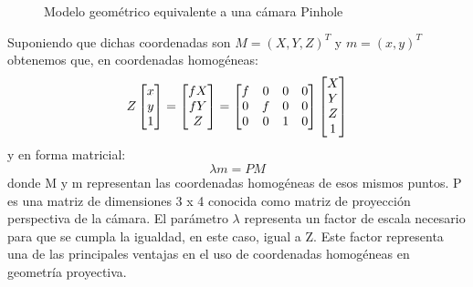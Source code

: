 \documentclass[a4,10pt]{article}
\begin{document}
\begin{enumerate}
\begin{figure}
\begin{center}
\end{center}
\caption{Modelo geométrico equivalente a una cámara Pinhole}
\label{fig:pinholegeo}
\end{figure}
Suponiendo que dichas coordenadas son $ M =(X,Y,Z)^T $ y $ m=(x,y)^T $ obtenemos que, en coordenadas homogéneas:
\begin{equation}
Z\\
\begin{bmatrix}
x\\
y\\
1
\end{bmatrix}
=
\begin{bmatrix}
fX\\
fY\\
Z
\end{bmatrix}
=
\begin{bmatrix}
f & 0 & 0 & 0\\
0 & f & 0 & 0\\
0 & 0 & 1 & 0
\end{bmatrix}
\begin{bmatrix}
X\\
Y\\
Z\\
1
\end{bmatrix}
\end{equation}
y en forma matricial:
\begin{equation}
\lambda m = PM
\end{equation}
donde M y m representan las coordenadas homogéneas de esos mismos puntos. P es una matriz de dimensiones 3 x 4 conocida como matriz de proyección perspectiva de la cámara. El parámetro $ \lambda $ representa un factor de escala necesario para que se cumpla la igualdad, en este caso, igual a Z. Este factor representa una de las principales ventajas en el uso de coordenadas homogéneas en geometría proyectiva.


\end{enumerate}
\end{document}
